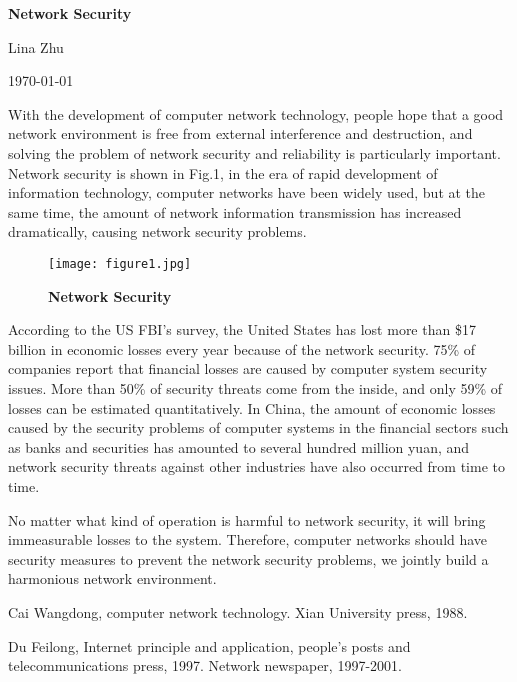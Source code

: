 \documentclass{article}
\begin{document}
	
	\begin{center}
		
		{\bfseries \LARGE  Network Security} 
		
	\end{center}
	\begin{center}
		Lina Zhu
	\end{center}
	\begin{center}
		\today
	\end{center}
	
	\par With the development of computer network technology, people hope that a good network environment is free from external interference and destruction, and solving the problem of network security and reliability is particularly important. Network security is shown in Fig.1, in the era of rapid development of information technology, computer networks have been widely used, but at the same time, the amount of network information transmission has increased dramatically, causing network security problems.
	\begin{figure}[htp]
		\centering
		\texttt{[image: figure1.jpg]}
		\caption{\bfseries{Network Security}}\label{pic1}
	\end{figure}
\par According to the US FBI's survey, the United States has lost more than \$17 billion in economic losses every year because of the network security. 75\% of companies report that financial losses are caused by computer system security issues. More than 50\% of security threats come from the inside, and only 59\% of losses can be estimated quantitatively. In China, the amount of economic losses caused by the security problems of computer systems in the financial sectors such as banks and securities has amounted to several hundred million yuan, and network security threats against other industries have also occurred from time to time.
\par	No matter what kind of operation is harmful to network security, it will bring immeasurable losses to the system. Therefore, computer networks should have security measures to prevent the network security problems, we jointly build a harmonious network environment.
	\begin{thebibliography}{99}
	   Cai Wangdong, computer network technology. Xian University press, 1988.
	
	   Du Feilong, Internet principle and application, people's posts and telecommunications press, 1997.
	   Network newspaper, 1997-2001.
\end{thebibliography}
\end{document}
